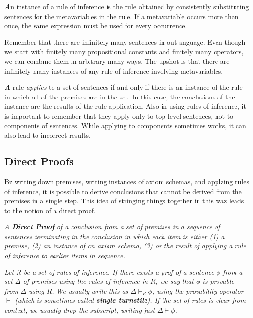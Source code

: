 \documentclass[10pt,a4pape,twocolumn]{article}
\newenvironment{callout}
	{\begin{calloutbox}\color{charcoal}\textbf\textit}
	{\end{calloutbox}}
\begin{document}
                \begin{callout}
                    An instance of a rule of inference is the rule obtained by consistently substituting sentences for the metavariables in the rule. If a metavariable occurs more than once, the same expression must be used for every occurrence.
                \end{callout}
                Remember that there are infinitely many sentences in out anguage. Even though we start with finitely many propositional constants and finitely many operators, we can combine them in arbitrary many ways. The upshot is that there are infinitely many instances of any rule of inference involving metavariables.
                \begin{callout}
                    A rule \textit{applies} to a set of sentences if and only if there is an instance of the rule in which all of the premises are in the set. In this case, the conclusions of the instance are the results of the rule application. Also in using rules of inference, it is important to remember that they apply only to top-level sentences, not to components of sentences. While applying to components sometimes works, it can also lead to incorrect results.
                \end{callout}
            \subsection{Direct Proofs}
                Bz writing down premises, writing instances of axiom schemas, and applzing rules of inference, it is possible to derive conclusions that cannot be derived from the premises in a single step. This idea of stringing things together in this waz leads to the notion of a direct proof.
                \begin{define}
                    \textit{A \textbf{Direct Proof} of a conclusion from a set of premises in a sequence of sentences terminating in the conclusion in which each item is either (1) a premise, (2) an instance of an axiom schema, (3) or the result of applying a rule of inference to earlier items in sequence.}
                \end{define}
                \begin{define}
                    \textit{Let $R$ be a set of rules of inference. If there exists a prof of a sentence $\phi$ from a set $\Delta$ of premises using the rules of inference in $R$, we say that $\phi$ is provable from $\Delta$ using $R$. We usually write this as $\Delta\vdash_R\phi$, using the provability operator $\vdash$ (which is sometimes called \textbf{single turnstile}). If the set of rules is clear from context, we usually drop the subscript, writing just $\Delta\vdash \phi$.}
                \end{define}
\end{document}
